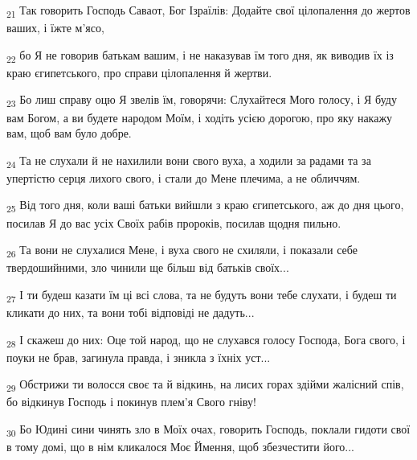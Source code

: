 \begin{tcolorbox}
\textsubscript{21} Так говорить Господь Саваот, Бог Ізраїлів: Додайте свої цілопалення до жертов ваших, і їжте м'ясо,
\end{tcolorbox}
\begin{tcolorbox}
\textsubscript{22} бо Я не говорив батькам вашим, і не наказував їм того дня, як виводив їх із краю єгипетського, про справи цілопалення й жертви.
\end{tcolorbox}
\begin{tcolorbox}
\textsubscript{23} Бо лиш справу оцю Я звелів їм, говорячи: Слухайтеся Мого голосу, і Я буду вам Богом, а ви будете народом Моїм, і ходіть усією дорогою, про яку накажу вам, щоб вам було добре.
\end{tcolorbox}
\begin{tcolorbox}
\textsubscript{24} Та не слухали й не нахилили вони свого вуха, а ходили за радами та за упертістю серця лихого свого, і стали до Мене плечима, а не обличчям.
\end{tcolorbox}
\begin{tcolorbox}
\textsubscript{25} Від того дня, коли ваші батьки вийшли з краю єгипетського, аж до дня цього, посилав Я до вас усіх Своїх рабів пророків, посилав щодня пильно.
\end{tcolorbox}
\begin{tcolorbox}
\textsubscript{26} Та вони не слухалися Мене, і вуха свого не схиляли, і показали себе твердошийними, зло чинили ще більш від батьків своїх...
\end{tcolorbox}
\begin{tcolorbox}
\textsubscript{27} І ти будеш казати їм ці всі слова, та не будуть вони тебе слухати, і будеш ти кликати до них, та вони тобі відповіді не дадуть...
\end{tcolorbox}
\begin{tcolorbox}
\textsubscript{28} І скажеш до них: Оце той народ, що не слухався голосу Господа, Бога свого, і поуки не брав, загинула правда, і зникла з їхніх уст...
\end{tcolorbox}
\begin{tcolorbox}
\textsubscript{29} Обстрижи ти волосся своє та й відкинь, на лисих горах здійми жалісний спів, бо відкинув Господь і покинув плем'я Свого гніву!
\end{tcolorbox}
\begin{tcolorbox}
\textsubscript{30} Бо Юдині сини чинять зло в Моїх очах, говорить Господь, поклали гидоти свої в тому домі, що в нім кликалося Моє Ймення, щоб збезчестити його...
\end{tcolorbox}
